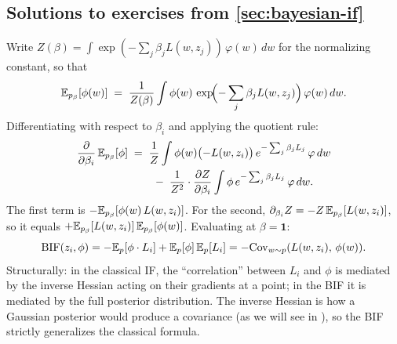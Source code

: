 \begin{pdfonly}\begin{solutionsonly}
\subsection{Solutions to exercises from \cref{sec:bayesian-if}}
\end{solutionsonly}\end{pdfonly}

\begin{solution}

Write $Z(\beta) = \int \exp(-\sum_j \beta_j L(w,z_j))\,\varphi(w)\,dw$ for the normalizing constant, so that
\[
  \mathbb{E}_{p_\beta}[\phi(w)] \;=\; \frac{1}{Z(\beta)}\int \phi(w)\,\exp\!\Bigl(-\sum_j \beta_j L(w,z_j)\Bigr)\,\varphi(w)\,dw.
\]
Differentiating with respect to $\beta_i$ and applying the quotient rule:
\begin{align*}
  \frac{\partial}{\partial\beta_i}\,\mathbb{E}_{p_\beta}[\phi] &\;=\; \frac{1}{Z}\int \phi(w)\bigl(-L(w,z_i)\bigr)\,e^{-\sum_j\beta_j L_j}\,\varphi\,dw \\
  &\qquad\;-\; \frac{1}{Z^2}\cdot\frac{\partial Z}{\partial\beta_i}\int \phi\,e^{-\sum_j\beta_j L_j}\,\varphi\,dw.
\end{align*}
The first term is $-\mathbb{E}_{p_\beta}[\phi(w)\,L(w,z_i)]$. For the second, $\partial_{\beta_i}Z = -Z\,\mathbb{E}_{p_\beta}[L(w,z_i)]$, so it equals $+\mathbb{E}_{p_\beta}[L(w,z_i)]\,\mathbb{E}_{p_\beta}[\phi(w)]$. Evaluating at $\beta=\mathbf{1}$:
\[
  \mathrm{BIF}(z_i,\phi) = -\mathbb{E}_p[\phi\cdot L_i] + \mathbb{E}_p[\phi]\,\mathbb{E}_p[L_i] = -\mathrm{Cov}_{w\sim p}(L(w,z_i),\,\phi(w)).
\]
Structurally: in the classical IF, the ``correlation'' between $L_i$ and $\phi$ is mediated by the inverse Hessian acting on their gradients at a point; in the BIF it is mediated by the full posterior distribution. The inverse Hessian is how a Gaussian posterior would produce a covariance (as we will see in ), so the BIF strictly generalizes the classical formula.

\end{solution}

